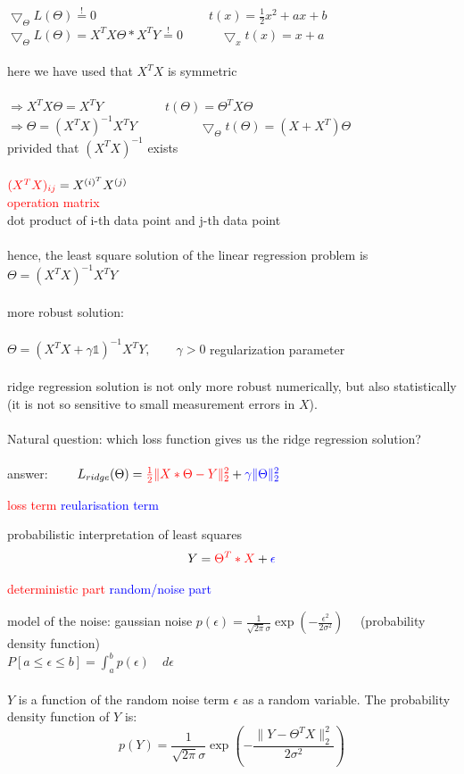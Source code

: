 	$\bigtriangledown_{\Theta} L(\Theta) \stackrel{!}{=} 0 \quad\quad\quad\quad\quad\quad\quad\quad\quad  t(x) = \frac{1}{2}x^2+ax+b$\\
	$\bigtriangledown_{\Theta} L(\Theta) = X^T X \Theta * X^T Y \stackrel{!}{=} 0  \quad\quad\quad \bigtriangledown_x t(x) = x+a$\\\\
	here we have used that $X^T X$ is symmetric\\\\
	$\Rightarrow X^T X \Theta = X^T Y \quad\quad\quad\quad\quad t(\Theta) = \Theta^T X \Theta$\\
	$\Rightarrow  \Theta = (X^T X)^{-1} X^T Y \quad\quad\quad\quad\quad \bigtriangledown_{\Theta} t(\Theta) = (X+X^T)\Theta$\\
	privided that $(X^T X)^{-1}$ exists\\\\
	$\textcolor{red}{(X^T X)_{ij}} = X^{(i)^T}X^{(j)}$\\
	\textcolor{red}{operation matrix}\\
	dot product of i-th data point and j-th data point\\\\
	hence, the least square solution of the linear regression problem is $\Theta = (X^T X)^{-1} X^T Y$\\\\
	more robust solution:\\\\
	$\Theta = (X^T X + \gamma \mathds{1})^{-1} X^T Y, \quad\quad \gamma > 0$ regularization parameter\\\\
	ridge regression solution is not only more robust numerically, but also statistically (it is not so sensitive to small measurement errors in $X$).\\\\
	Natural question: which loss function gives us the ridge regression solution?\\\\
	answer: $\quad\quad L_{ridge} (\Theta)= \textcolor{red}{\frac{1}{2} \lVert X * \Theta - Y \lVert_2^2} + \textcolor{blue}{\gamma \lVert \Theta \lVert_2^2}$
	\begin{center}
	\textcolor{red}{loss term} \space\space \textcolor{blue}{reularisation term}
	\end{center}
	probabilistic interpretation of least squares
	\[ Y = \textcolor{red}{\Theta^T * X} + \textcolor{blue}{\epsilon} \]
	\begin{center}
	\textcolor{red}{deterministic part} \space\space \textcolor{blue}{random/noise part}
	\end{center}
	model of the noise: gaussian noise \space\space $p(\epsilon)= \frac{1}{\sqrt{2\pi}\sigma} \exp (- \frac{\epsilon^2}{2 \sigma^2}) \quad$ (probability density function)\\
	$P[a \leq \epsilon \leq b] = \int_a^b p(\epsilon)\quad d\epsilon$\\\\
	$Y$ is a function of the random noise term $\epsilon$ as a random variable. The probability density function of $Y$ is:
	\[ p(Y) = \frac{1}{\sqrt{2 \pi}\sigma} \exp(- \frac{\lVert Y - \Theta^T X \lVert^2_2}{2 \sigma^2})\]
